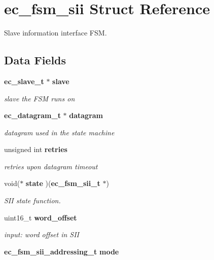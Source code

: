 \section{ec\-\_\-fsm\-\_\-sii \-Struct \-Reference}
\label{structec__fsm__sii}


\-Slave information interface \-F\-S\-M.  


\subsection*{\-Data \-Fields}
\begin{DoxyCompactItemize}
\item 
{\bf ec\-\_\-slave\-\_\-t} $\ast$ {\bf slave}\label{structec__fsm__sii_a8900a8deb8f7f8fa21b678bb45c49bd6}

\begin{DoxyCompactList}\small\item\em slave the \-F\-S\-M runs on \end{DoxyCompactList}\item 
{\bf ec\-\_\-datagram\-\_\-t} $\ast$ {\bf datagram}\label{structec__fsm__sii_a0b742789c074c3ebff83f0892571fd20}

\begin{DoxyCompactList}\small\item\em datagram used in the state machine \end{DoxyCompactList}\item 
unsigned int {\bf retries}\label{structec__fsm__sii_a1571b23ec01b79dc7287d327cc6a4812}

\begin{DoxyCompactList}\small\item\em retries upon datagram timeout \end{DoxyCompactList}\item 
void($\ast$ {\bf state} )({\bf ec\-\_\-fsm\-\_\-sii\-\_\-t} $\ast$)\label{structec__fsm__sii_a38d4274ecd8a9e1cd3135184a48fb218}

\begin{DoxyCompactList}\small\item\em \-S\-I\-I state function. \end{DoxyCompactList}\item 
uint16\-\_\-t {\bf word\-\_\-offset}\label{structec__fsm__sii_afecb19ccde2a49881d9430c65a854880}

\begin{DoxyCompactList}\small\item\em input\-: word offset in \-S\-I\-I \end{DoxyCompactList}\item 
{\bf ec\-\_\-fsm\-\_\-sii\-\_\-addressing\-\_\-t} {\bf mode}\label{structec__fsm__sii_abe104575bf34cbfb34beee82562524a7}


\end{DoxyCompactItemize}

